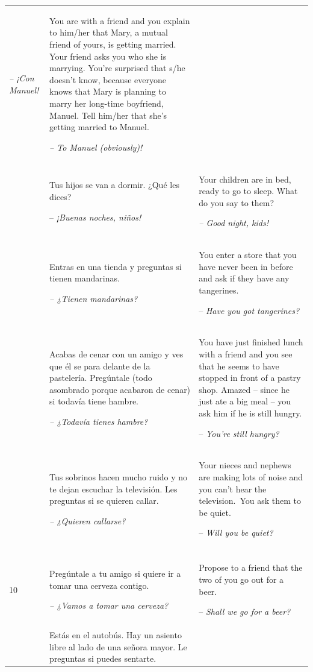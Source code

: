 \begin{xltabular}{\textwidth}{lQQ}
\textit{-- ¡Con Manuel!} & You are with a friend and you explain to him/her that Mary, a mutual friend of yours, is getting married. Your friend asks you who she is marrying. You're surprised that s/he doesn’t know, because everyone knows that Mary is planning to marry her long-time boyfriend, Manuel. Tell him/her that she’s getting married to Manuel.

{\itshape -- To Manuel (obviously)!}\\
 & Tus hijos se van a dormir. ¿Qué les dices?

-- \textit{¡Buenas noches, niños!} & Your children are in bed, ready to go to sleep. What do you say to them?

\textit{-- Good night, kids!}\\
 & Entras en una tienda y preguntas si tienen mandarinas.

\textit{-- ¿Tienen mandarinas?} & You enter a store that you have never been in before and ask if they have any tangerines.

-- \textit{Have you got tangerines?}\\
 & Acabas de cenar con un amigo y ves que él se para delante de la pastelería. Pregúntale (todo asombrado porque acabaron de cenar) si todavía tiene hambre.

\textit{-- ¿Todavía tienes hambre?} & You have just finished lunch with a friend and you see that he seems to have stopped in front of a pastry shop. Amazed -- since he just ate a big meal -- you ask him if he is still hungry.

-- \textit{You’re still hungry?}\\
 & Tus sobrinos hacen mucho ruido y no te dejan escuchar la televisión. Les preguntas si se quieren callar.

\textit{-- ¿Quieren callarse?} & Your nieces and nephews are making lots of noise and you can’t hear the television.~You ask them to be quiet.

-- \textit{Will you be quiet?}\\
\\
10 & Pregúntale a tu amigo si quiere ir a tomar una cerveza contigo.

\textit{-- ¿Vamos a tomar una cerveza?} & Propose to a friend that the two of you go out for a beer.

-- \textit{Shall we go for a beer?}\\
 & Estás en el autobús. Hay un asiento libre al lado de una señora mayor. Le preguntas si puedes sentarte.


\end{xltabular}

